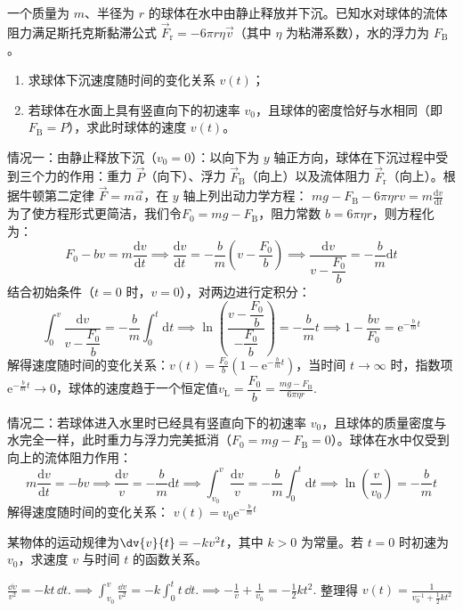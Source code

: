 \begin{example}
一个质量为 $m$、半径为 $r$ 的球体在水中由静止释放并下沉。已知水对球体的流体阻力满足斯托克斯黏滞公式 $\vec{F}_{\text{r}} = -6\pi r \eta \vec{v}$（其中 $\eta$ 为粘滞系数），水的浮力为 $F_{\text{B}}$。
\begin{enumerate}
\item 求球体下沉速度随时间的变化关系 $v(t)$；
\item 若球体在水面上具有竖直向下的初速率 $v_0$，且球体的密度恰好与水相同（即 $F_{\text{B}} = P$），求此时球体的速度 $v(t)$。
\end{enumerate}
\end{example}
\begin{solution}
情况一：由静止释放下沉（$v_0 = 0$）：以向下为 $y$ 轴正方向，球体在下沉过程中受到三个力的作用：重力 $\vec{P}$（向下）、浮力 $\vec{F}_{\text{B}}$（向上）以及流体阻力 $\vec{F}_{\text{r}}$（向上）。根据牛顿第二定律 $\vec{F} = m\vec{a}$，在 $y$ 轴上列出动力学方程：
 \(mg - F_{\text{B}} - 6\pi \eta r v = m\frac{\mathrm{d}v}{\mathrm{d}t}\) 
为了使方程形式更简洁，我们令$F_0 = mg - F_{\text{B}}$，阻力常数 $b = 6\pi \eta r$，则方程化为：
$$F_0 - bv = m\frac{\mathrm{d}v}{\mathrm{d}t}\implies\frac{\mathrm{d}v}{\mathrm{d}t} = -\frac{b}{m}\left(v - \frac{F_0}{b}\right) \implies \frac{\mathrm{d}v}{v - \dfrac{F_0}{b}} = -\frac{b}{m}\mathrm{d}t$$
结合初始条件（$t=0$ 时，$v=0$），对两边进行定积分：
$$\int_{0}^{v} \frac{\mathrm{d}v}{v - \dfrac{F_0}{b}} = -\frac{b}{m}\int_{0}^{t}\mathrm{d}t\implies\ln\left( \frac{v - \dfrac{F_0}{b}}{-\dfrac{F_0}{b}} \right) = -\frac{b}{m}t \implies 1 - \frac{bv}{F_0} = \mathrm{e}^{-\frac{b}{m}t}$$
解得速度随时间的变化关系：$v(t) = \frac{F_0}{b}\left(1 - \mathrm{e}^{-\frac{b}{m}t}\right)$，当时间 $t \to \infty$ 时，指数项 $\mathrm{e}^{-\frac{b}{m}t} \to 0$，球体的速度趋于一个恒定值$v_{\text{L}} = \dfrac{F_0}{b} = \frac{mg - F_{\text{B}}}{6\pi \eta r}$.

情况二：若球体进入水里时已经具有竖直向下的初速率 $v_0$，且球体的质量密度与水完全一样，此时重力与浮力完美抵消（$F_0 = mg - F_{\text{B}} = 0$）。球体在水中仅受到向上的流体阻力作用：$$m\frac{\mathrm{d}v}{\mathrm{d}t} = -bv \implies \frac{\mathrm{d}v}{v} = -\frac{b}{m}\mathrm{d}t\implies\int_{v_0}^{v} \frac{\mathrm{d}v}{v} = -\frac{b}{m}\int_{0}^{t}\mathrm{d}t \implies \ln\left(\frac{v}{v_0}\right) = -\frac{b}{m}t$$解得速度随时间的变化关系： \(v(t) = v_0\mathrm{e}^{-\frac{b}{m}t}\) 
\end{solution}


\begin{exercise}
某物体的运动规律为$\dv{v}{t}=-kv^2t$，其中 \(k>0\) 为常量。若 \(t=0\) 时初速为 \(v_0\)，求速度 \(v\) 与时间 \(t\) 的函数关系。
\end{exercise}
\begin{solution}
 \(\frac{\dd v}{v^2}=-kt\,\dd t.\implies \int_{v_0}^{v}\frac{\dd v}{v^2} =-k\int_0^t t\,\dd t. \implies -\frac{1}{v}+\frac{1}{v_0} =-\frac12kt^2.\) 
整理得
 \(v(t)=\frac{1}{v_0^{-1}+\frac12kt^2}\) 
\end{solution}

